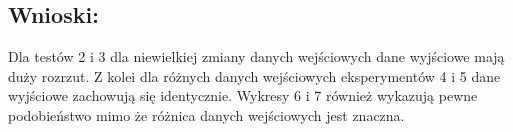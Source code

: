 \subsection{Wnioski:}
Dla testów 2 i 3 dla niewielkiej zmiany danych wejściowych dane wyjściowe mają duży rozrzut. Z kolei dla różnych danych wejściowych eksperymentów 4 i 5 dane wyjściowe zachowują się identycznie. Wykresy 6 i 7 również wykazują pewne podobieństwo mimo że różnica danych wejściowych jest znaczna.

